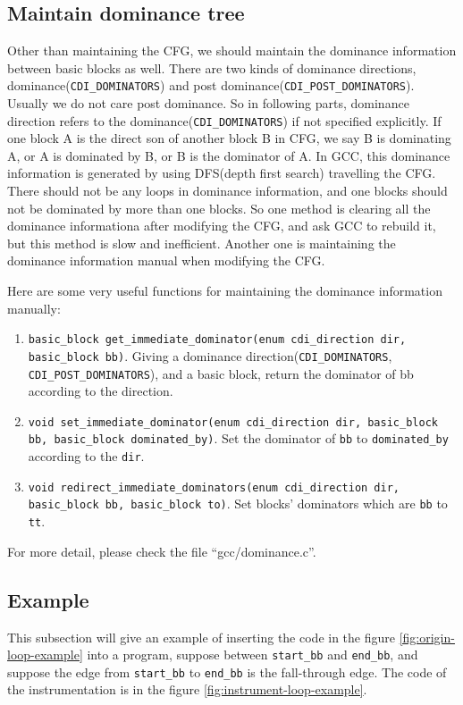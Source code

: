 \documentclass[11pt]{article}
\begin{document}
\subsection{Maintain dominance tree}
Other than maintaining the CFG, we should maintain the dominance information between basic blocks as well. There are two kinds of dominance directions, dominance(\texttt{CDI\_DOMINATORS}) and post dominance(\texttt{CDI\_POST\_DOMINATORS}). Usually we do not care post dominance. So in following parts, dominance direction refers to the dominance(\texttt{CDI\_DOMINATORS}) if not specified explicitly. If one block A is the direct son of another block B in CFG, we say B is dominating A, or A is dominated by B, or B is the dominator of A. In GCC, this dominance information is generated by using DFS(depth first search) travelling the CFG. There should not be any loops in dominance information, and one blocks should not be dominated by more than one blocks. So one method is clearing all the dominance informationa after modifying the CFG, and ask GCC to rebuild it, but this method is slow and inefficient. Another one is maintaining the dominance information manual when modifying the CFG. 


Here are some very useful functions for maintaining the dominance information manually:
\begin{enumerate}
\item \texttt{basic\_block get\_immediate\_dominator(enum cdi\_direction dir, basic\_block bb)}. Giving a dominance direction(\texttt{CDI\_DOMINATORS}, \texttt{CDI\_POST\_DOMINATORS}), and a basic block, return the dominator of bb according to the direction. 
\item \texttt{void set\_immediate\_dominator(enum cdi\_direction dir, basic\_block bb, basic\_block dominated\_by)}. Set the dominator of \texttt{bb} to \texttt{dominated\_by} according to the \texttt{dir}.
\item \texttt{void redirect\_immediate\_dominators(enum cdi\_direction dir, basic\_block bb, basic\_block to)}. Set blocks' dominators which are \texttt{bb} to \texttt{tt}.
\end{enumerate}

For more detail, please check the file ``gcc/dominance.c''.

\subsection{Example}
This subsection will give an example of inserting the code in the figure \ref{fig:origin-loop-example} into a program, suppose between \texttt{start\_bb} and \texttt{end\_bb}, and suppose the edge from \texttt{start\_bb} to \texttt{end\_bb} is the fall-through edge. The code of the instrumentation is in the figure \ref{fig:instrument-loop-example}.
\end{document}
